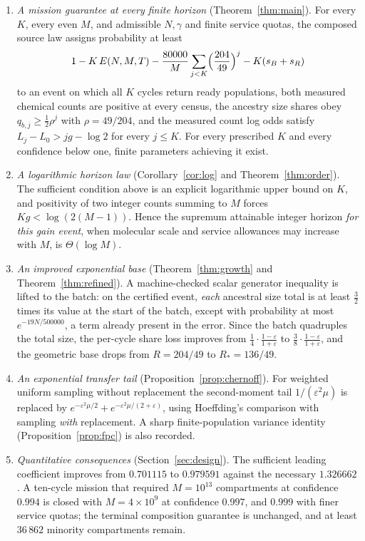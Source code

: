 \documentclass[11pt,a4paper]{article}
\theoremstyle{plain}
\theoremstyle{definition}
\theoremstyle{remark}
\newcommand{\eps}{\varepsilon}
\begin{document}
\begin{enumerate}[label=(\roman*)]
\item \emph{A mission guarantee at every finite horizon}
(Theorem~\ref{thm:main}). For every $K$, every even $M$, and admissible
$N,\gamma$ and finite service quotas, the composed source law assigns
probability at least
\[
1-K\,E(N,M,T)-\frac{80000}{M}\sum_{j<K}\Bigl(\frac{204}{49}\Bigr)^{j}-K(s_B+s_R)
\]
to an event on which all $K$ cycles return ready populations, both measured
chemical counts are positive at every census, the ancestry size shares obey
$q_{b,j}\ge\frac12\rho^{j}$ with $\rho=49/204$, and the measured count log odds
satisfy $L_j-L_0>jg-\log2$ for every $j\le K$. For every prescribed $K$ and
every confidence below one, finite parameters achieving it exist.

\item \emph{A logarithmic horizon law} (Corollary~\ref{cor:log} and
Theorem~\ref{thm:order}). The sufficient condition above is an explicit
logarithmic upper bound on $K$, and positivity of two integer counts summing to
$M$ forces $Kg<\log(2(M-1))$. Hence the supremum attainable integer horizon
\emph{for this gain event}, when molecular scale and service allowances may
increase with $M$, is $\Theta(\log M)$.

\item \emph{An improved exponential base} (Theorem~\ref{thm:growth} and
Theorem~\ref{thm:refined}). A machine-checked scalar generator inequality is
lifted to the batch: on the certified event, \emph{each} ancestral size total
is at least $\frac32$ times its value at the start of the batch, except with
probability at most $e^{-19N/500000}$, a term already present in the error.
Since the batch quadruples the total size, the per-cycle share loss improves
from $\frac14\cdot\frac{1-\eps}{1+\eps}$ to $\frac38\cdot\frac{1-\eps}{1+\eps}$,
and the geometric base drops from $R=204/49$ to $R_*=136/49$.

\item \emph{An exponential transfer tail} (Proposition~\ref{prop:chernoff}).
For weighted uniform sampling without replacement the second-moment tail
$1/(\eps^2\mu)$ is replaced by $e^{-\eps^2\mu/2}+e^{-\eps^2\mu/(2+\eps)}$, using
Hoeffding's comparison with sampling \emph{with} replacement. A sharp
finite-population variance identity (Proposition~\ref{prop:fpc}) is also
recorded.

\item \emph{Quantitative consequences} (Section~\ref{sec:design}). The
sufficient leading coefficient improves from $0.701115$ to $0.979591$ against
the necessary $1.326662$. A ten-cycle mission that required $M=10^{13}$
compartments at confidence $0.994$ is closed with $M=4\times10^{9}$ at
confidence $0.997$, and $0.999$ with finer service quotas; the terminal
composition guarantee is unchanged, and at least $36\,862$ minority
compartments remain.


\end{enumerate}
\end{document}
